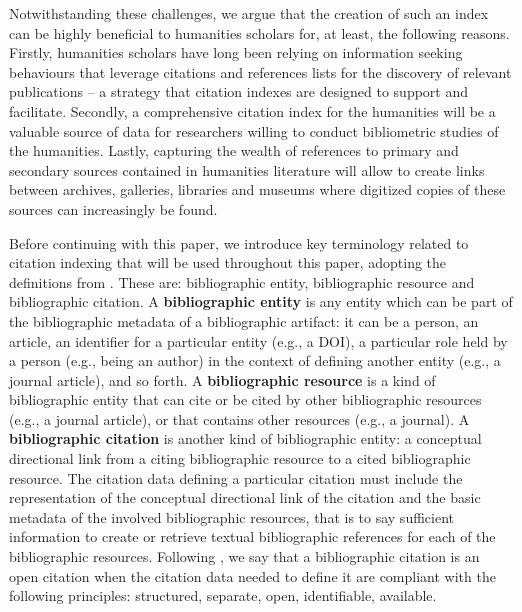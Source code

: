 Notwithstanding these challenges, we argue that the creation of such an index can be highly beneficial to humanities scholars for, at least, the following reasons. Firstly, humanities scholars have long been relying on information seeking behaviours that leverage citations and references lists for the discovery of relevant publications -- a strategy that citation indexes are designed to support and facilitate. Secondly, a comprehensive citation index for the humanities will be a valuable source of data for researchers willing to conduct bibliometric studies of the humanities. Lastly, capturing the wealth of references to primary and secondary sources contained in humanities literature will allow to create links between archives, galleries, libraries and museums where digitized copies of these sources can increasingly be found.

Before continuing with this paper, we introduce key terminology related to citation indexing that will be used throughout this paper, adopting the definitions from \cite{peroni_opencitations_2018}. These are: bibliographic entity, bibliographic resource and bibliographic citation.
A \textbf{bibliographic entity} is any entity which can be part of the bibliographic metadata of a bibliographic artifact: it can be a person, an article, an identifier for a particular entity (e.g., a DOI), a particular role held by a person (e.g., being an author) in the context of defining another entity (e.g., a journal article), and so forth. A \textbf{bibliographic resource} is a kind of bibliographic entity that can cite or be cited by other bibliographic resources (e.g., a journal article), or that contains other  resources (e.g., a journal). A \textbf{bibliographic citation} is another kind of bibliographic entity: a conceptual directional link from a citing bibliographic resource to a cited bibliographic resource.
The citation data defining a particular citation must include the representation of the conceptual directional link of the citation and the basic metadata of the involved bibliographic resources, that is to say sufficient information to create or retrieve textual bibliographic references for each of the bibliographic resources. Following \cite{peroni_open_2018}, we say that a bibliographic citation is an open citation when the citation data needed to define it are compliant with the following principles: structured, separate, open, identifiable, available.

